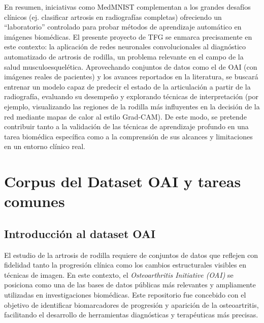 \documentclass[11pt,spanish,listoffigures,listoftables]{tfgetsinf}
\begin{document}
En resumen, iniciativas como MedMNIST complementan a los grandes desafíos clínicos (ej. clasificar artrosis en radiografías 
completas) ofreciendo un “laboratorio” controlado para probar métodos de aprendizaje automático en imágenes biomédicas. 
El presente proyecto de TFG se enmarca precisamente en este contexto: la aplicación de redes neuronales convolucionales 
al diagnóstico automatizado de artrosis de rodilla, un problema relevante en el campo de la salud musculoesquelética. 
Aprovechando conjuntos de datos como el de OAI \cite{chen2018knee} (con imágenes reales de pacientes) y los avances reportados en la literatura, se 
buscará entrenar un modelo capaz de predecir el estado de la articulación a partir de la radiografía, evaluando su desempeño 
y explorando técnicas de interpretación (por ejemplo, visualizando las regiones de la rodilla más influyentes en la decisión 
de la red mediante mapas de calor al estilo Grad-CAM). De este modo, se pretende contribuir tanto a la validación de las 
técnicas de aprendizaje profundo en una tarea biomédica específica como a la comprensión de sus alcances y limitaciones en 
un entorno clínico real.




\chapter{Corpus del Dataset OAI y tareas comunes}
\label{chap:corpus}

\section{Introducción al dataset OAI}

El estudio de la artrosis de rodilla requiere de conjuntos de datos que reflejen con fidelidad tanto la progresión clínica 
como los cambios estructurales visibles en técnicas de imagen. En este contexto, el \textit{Osteoarthritis Initiative (OAI)}\cite{chen2018knee}
se posiciona como una de las bases de datos públicas más relevantes y ampliamente utilizadas en investigaciones biomédicas. 
Este repositorio fue concebido con el objetivo de identificar biomarcadores de progresión y aparición de la osteoartritis, 
facilitando el desarrollo de herramientas diagnósticas y terapéuticas más precisas.
\end{document}
